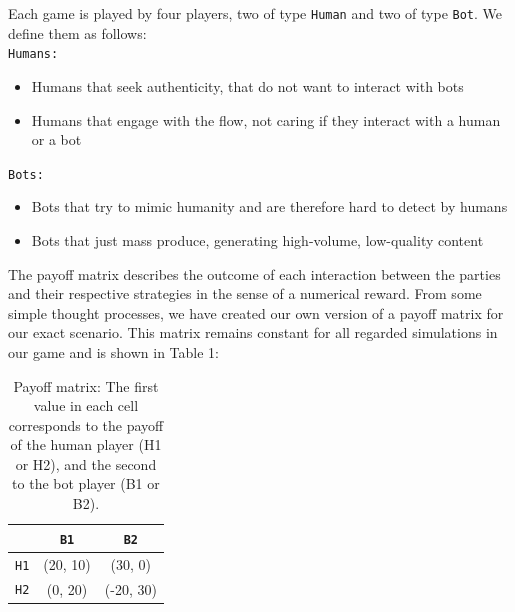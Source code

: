 \documentclass{article}
\begin{document}
Each game is played by four players, two of type \texttt{Human} and two of type \texttt{Bot}. We define them as follows: \\
\texttt{Humans:}
    \begin{itemize}
        \item[H1] Humans that seek authenticity, that do not want to interact with bots
        \item[H2] Humans that engage with the flow, not caring if they interact with a human or a bot 
    \end{itemize}
\texttt{Bots:}
    \begin{itemize}
        \item[B1] Bots that try to mimic humanity and are therefore hard to detect by humans
        \item[B2] Bots that just mass produce, generating high-volume, low-quality content
        
        
\end{itemize}

The payoff matrix describes the outcome of each interaction between the parties and their respective strategies in the sense of a numerical reward. From some simple thought processes, we have created our own version of a payoff matrix for our exact scenario. This matrix remains constant for all regarded simulations in our game and is shown in Table 1: 

\begin{table}[h!]
\centering
\begin{tabular}{c|c|c}
& \texttt{B1} & \texttt{B2} \\
\hline
\texttt{H1} & (20, 10) & (30, 0) \\
\texttt{H2} & (0, 20) & (-20, 30) \\
\end{tabular}
\caption{\footnotesize Payoff matrix: The first value in each cell corresponds to the payoff of the human player (H1 or H2), and the second to the bot player (B1 or B2).}
\end{table}
\end{document}
